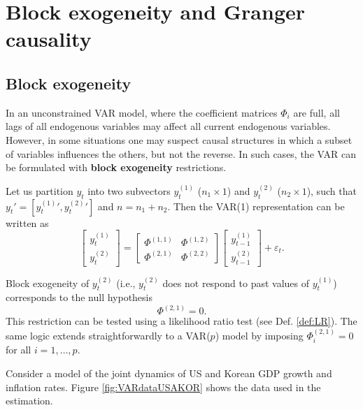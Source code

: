 \documentclass[
  12pt,
]{book}
\theoremstyle{definition}
\theoremstyle{definition}
\theoremstyle{definition}
\theoremstyle{definition}
\theoremstyle{remark}
\begin{document}
\section{Block exogeneity and Granger causality}\label{BlockGranger}

\subsection{Block exogeneity}\label{block-exogeneity}

In an unconstrained VAR model, where the coefficient matrices \(\Phi_i\) are full, all lags of all endogenous variables may affect all current endogenous variables. However, in some situations one may suspect causal structures in which a subset of variables influences the others, but not the reverse. In such cases, the VAR can be formulated with \textbf{block exogeneity} restrictions.

Let us partition \(y_t\) into two subvectors \(y^{(1)}_{t}\) (\(n_1 \times 1\)) and \(y^{(2)}_{t}\) (\(n_2 \times 1\)), such that \(y_t' = [{y^{(1)}_{t}}',{y^{(2)}_{t}}']\) and \(n = n_1 + n_2\). Then the VAR(1) representation can be written as
\[
\begin{bmatrix}
y^{(1)}_{t} \\
y^{(2)}_{t}
\end{bmatrix}
=
\begin{bmatrix}
\Phi^{(1,1)} & \Phi^{(1,2)} \\
\Phi^{(2,1)} & \Phi^{(2,2)}
\end{bmatrix}
\begin{bmatrix}
y^{(1)}_{t-1} \\
y^{(2)}_{t-1}
\end{bmatrix}
+
\varepsilon_t.
\]

Block exogeneity of \(y^{(2)}_t\) (i.e., \(y^{(2)}_t\) does not respond to past values of \(y^{(1)}_t\)) corresponds to the null hypothesis
\[
\Phi^{(2,1)} = 0.
\]
This restriction can be tested using a likelihood ratio test (see Def. \ref{def:LR}). The same logic extends straightforwardly to a VAR(\(p\)) model by imposing \(\Phi^{(2,1)}_i = 0\) for all \(i = 1,\dots,p\).

Consider a model of the joint dynamics of US and Korean GDP growth and inflation rates. Figure \ref{fig:VARdataUSAKOR} shows the data used in the estimation.
\end{document}
